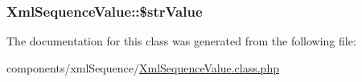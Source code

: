 \hypertarget{class_xml_sequence_value_fc1506e7e5507c5204dbed497858204b}{
\subsubsection[{\$strValue}]{\setlength{\rightskip}{0pt plus 5cm}XmlSequenceValue::\$strValue}}
\label{class_xml_sequence_value_fc1506e7e5507c5204dbed497858204b}




The documentation for this class was generated from the following file:\begin{CompactItemize}
\item 
components/xmlSequence/\hyperlink{_xml_sequence_value_8class_8php}{XmlSequenceValue.class.php}\end{CompactItemize}
